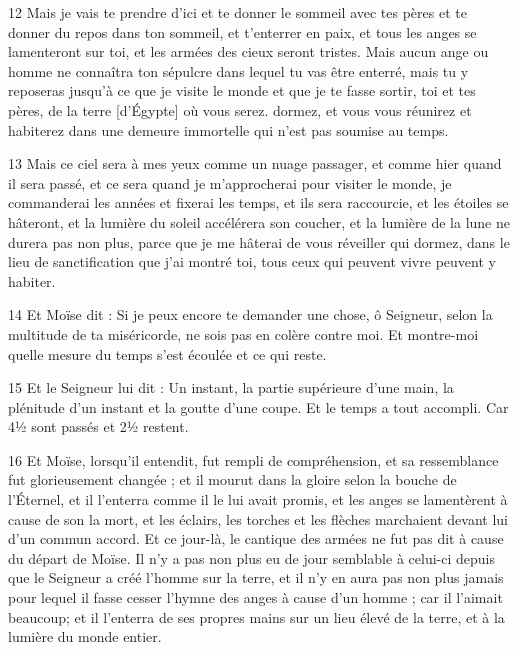 \par 12 Mais je vais te prendre d'ici et te donner le sommeil avec tes pères et te donner du repos dans ton sommeil, et t'enterrer en paix, et tous les anges se lamenteront sur toi, et les armées des cieux seront tristes. Mais aucun ange ou homme ne connaîtra ton sépulcre dans lequel tu vas être enterré, mais tu y reposeras jusqu'à ce que je visite le monde et que je te fasse sortir, toi et tes pères, de la terre [d'Égypte] où vous serez. dormez, et vous vous réunirez et habiterez dans une demeure immortelle qui n'est pas soumise au temps.

\par 13 Mais ce ciel sera à mes yeux comme un nuage passager, et comme hier quand il sera passé, et ce sera quand je m'approcherai pour visiter le monde, je commanderai les années et fixerai les temps, et ils sera raccourcie, et les étoiles se hâteront, et la lumière du soleil accélérera son coucher, et la lumière de la lune ne durera pas non plus, parce que je me hâterai de vous réveiller qui dormez, dans le lieu de sanctification que j'ai montré toi, tous ceux qui peuvent vivre peuvent y habiter.

\par 14 Et Moïse dit : Si je peux encore te demander une chose, ô Seigneur, selon la multitude de ta miséricorde, ne sois pas en colère contre moi. Et montre-moi quelle mesure du temps s'est écoulée et ce qui reste.

\par 15 Et le Seigneur lui dit : Un instant, la partie supérieure d'une main, la plénitude d'un instant et la goutte d'une coupe. Et le temps a tout accompli. Car 4½ sont passés et 2½ restent.

\par 16 Et Moïse, lorsqu'il entendit, fut rempli de compréhension, et sa ressemblance fut glorieusement changée ; et il mourut dans la gloire selon la bouche de l'Éternel, et il l'enterra comme il le lui avait promis, et les anges se lamentèrent à cause de son la mort, et les éclairs, les torches et les flèches marchaient devant lui d'un commun accord. Et ce jour-là, le cantique des armées ne fut pas dit à cause du départ de Moïse. Il n'y a pas non plus eu de jour semblable à celui-ci depuis que le Seigneur a créé l'homme sur la terre, et il n'y en aura pas non plus jamais pour lequel il fasse cesser l'hymne des anges à cause d'un homme ; car il l'aimait beaucoup; et il l'enterra de ses propres mains sur un lieu élevé de la terre, et à la lumière du monde entier.

